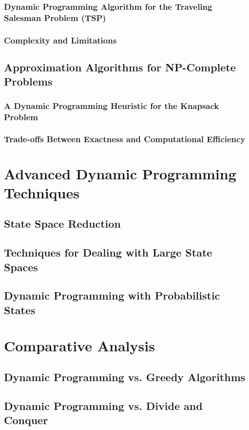 \documentclass[12pt]{book} %
\begin{document}
\subsubsection{Dynamic Programming Algorithm for the Traveling Salesman Problem (TSP)}
\subsubsection{Complexity and Limitations}
\subsection{Approximation Algorithms for NP-Complete Problems}
\subsubsection{A Dynamic Programming Heuristic for the Knapsack Problem}
\subsubsection{Trade-offs Between Exactness and Computational Efficiency}

\section{Advanced Dynamic Programming Techniques}
\subsection{State Space Reduction}
\subsection{Techniques for Dealing with Large State Spaces}
\subsection{Dynamic Programming with Probabilistic States}

\section{Comparative Analysis}
\subsection{Dynamic Programming vs. Greedy Algorithms}
\subsection{Dynamic Programming vs. Divide and Conquer}
\end{document}
